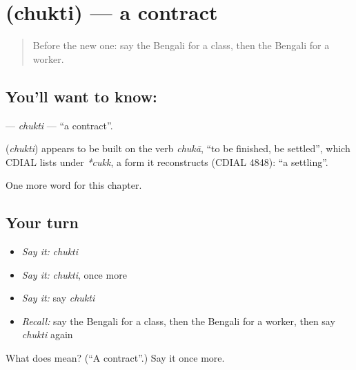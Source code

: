 \section[\texorpdfstring{\bn{চুক্তি} (chukti)}{চুক্তি (chukti)}]{ (chukti) — a contract}

\label{lesson:BN-C236-chukti}



\begin{quote}
Before the new one: say the Bengali for a class, then the Bengali for a worker.
\end{quote}

\subsection*{You'll want to know: }
\textbf{} — \emph{chukti} — \textquotedblleft{}a contract\textquotedblright{}.

\begin{cousinweb}
\textbf{} (\emph{chukti}) appears to be built on the verb \emph{chukā}, \textquotedblleft{}to be finished, be settled\textquotedblright{}, which CDIAL lists under \emph{*cukk}, a form it reconstructs (CDIAL 4848): \textquotedblleft{}a settling\textquotedblright{}.
\end{cousinweb}

\begin{grammarlens}[title={What you've built}]
One more word for this chapter.
\end{grammarlens}

\subsection*{Your turn}
\begin{itemize}
\raggedright
  \item \emph{Say it:} \emph{chukti}
  \item \emph{Say it:} \emph{chukti}, once more
  \item \emph{Say it:} say \emph{chukti}
  \item \emph{Recall:} say the Bengali for a class, then the Bengali for a worker, then say \emph{chukti} again
\end{itemize}

\begin{tcolorbox}[breakable,colback=teal!4,colframe=teal!35!black,title={Before you move on}]
What does  mean? (\textquotedblleft{}A contract\textquotedblright{}.) Say it once more.
\end{tcolorbox}

